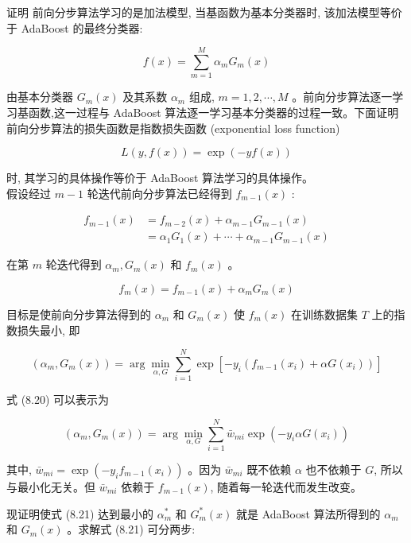 \documentclass[10pt]{article}
\begin{document}
证明 前向分步算法学习的是加法模型, 当基函数为基本分类器时, 该加法模型等价于 AdaBoost 的最终分类器:


\begin{equation*}
f(x)=\sum_{m=1}^{M} \alpha_{m} G_{m}(x) \tag{8.19}
\end{equation*}


由基本分类器 $G_{m}(x)$ 及其系数 $\alpha_{m}$ 组成, $m=1,2, \cdots, M$ 。前向分步算法逐一学习基函数,这一过程与 AdaBoost 算法逐一学习基本分类器的过程一致。下面证明前向分步算法的损失函数是指数损失函数 (exponential loss function)

$$
L(y, f(x))=\exp (-y f(x))
$$

时, 其学习的具体操作等价于 AdaBoost 算法学习的具体操作。\\
假设经过 $m-1$ 轮迭代前向分步算法已经得到 $f_{m-1}(x)$ :

$$
\begin{aligned}
f_{m-1}(x) & =f_{m-2}(x)+\alpha_{m-1} G_{m-1}(x) \\
& =\alpha_{1} G_{1}(x)+\cdots+\alpha_{m-1} G_{m-1}(x)
\end{aligned}
$$

在第 $m$ 轮迭代得到 $\alpha_{m}, G_{m}(x)$ 和 $f_{m}(x)$ 。

$$
f_{m}(x)=f_{m-1}(x)+\alpha_{m} G_{m}(x)
$$

目标是使前向分步算法得到的 $\alpha_{m}$ 和 $G_{m}(x)$ 使 $f_{m}(x)$ 在训练数据集 $T$ 上的指数损失最小, 即


\begin{equation*}
\left(\alpha_{m}, G_{m}(x)\right)=\arg \min _{\alpha, G} \sum_{i=1}^{N} \exp \left[-y_{i}\left(f_{m-1}\left(x_{i}\right)+\alpha G\left(x_{i}\right)\right)\right] \tag{8.20}
\end{equation*}


式 (8.20) 可以表示为


\begin{equation*}
\left(\alpha_{m}, G_{m}(x)\right)=\arg \min _{\alpha, G} \sum_{i=1}^{N} \bar{w}_{m i} \exp \left(-y_{i} \alpha G\left(x_{i}\right)\right) \tag{8.21}
\end{equation*}


其中, $\bar{w}_{m i}=\exp \left(-y_{i} f_{m-1}\left(x_{i}\right)\right)$ 。因为 $\bar{w}_{m i}$ 既不依赖 $\alpha$ 也不依赖于 $G$, 所以与最小化无关。但 $\bar{w}_{m i}$ 依赖于 $f_{m-1}(x)$, 随着每一轮迭代而发生改变。

现证明使式 (8.21) 达到最小的 $\alpha_{m}^{*}$ 和 $G_{m}^{*}(x)$ 就是 AdaBoost 算法所得到的 $\alpha_{m}$ 和 $G_{m}(x)$ 。求解式 (8.21) 可分两步:
\end{document}
